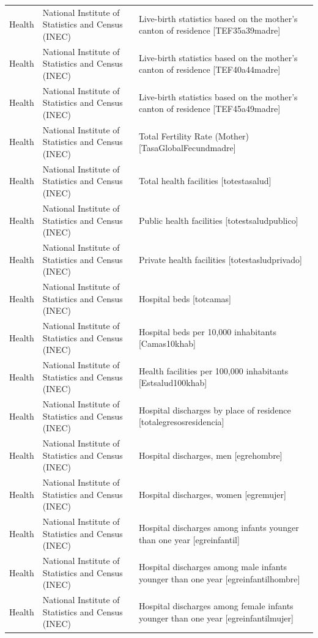 \begin{landscape}
\begin{longtable}[t]{>{\raggedright\arraybackslash}p{3.4cm}>{\raggedright\arraybackslash}p{5.6cm}>{\raggedright\arraybackslash}p{12.4cm}}
Health & National Institute of Statistics and Census (INEC) & Live-birth statistics based on the mother's canton of residence [TEF35a39madre]\\
Health & National Institute of Statistics and Census (INEC) & Live-birth statistics based on the mother's canton of residence [TEF40a44madre]\\
Health & National Institute of Statistics and Census (INEC) & Live-birth statistics based on the mother's canton of residence [TEF45a49madre]\\
Health & National Institute of Statistics and Census (INEC) & Total Fertility Rate (Mother) [TasaGlobalFecundmadre]\\
Health & National Institute of Statistics and Census (INEC) & Total health facilities [totestasalud]\\
Health & National Institute of Statistics and Census (INEC) & Public health facilities [totestsaludpublico]\\
Health & National Institute of Statistics and Census (INEC) & Private health facilities [totestasludprivado]\\
Health & National Institute of Statistics and Census (INEC) & Hospital beds [totcamas]\\
Health & National Institute of Statistics and Census (INEC) & Hospital beds per 10,000 inhabitants [Camas10khab]\\
Health & National Institute of Statistics and Census (INEC) & Health facilities per 100,000 inhabitants [Estsalud100khab]\\
Health & National Institute of Statistics and Census (INEC) & Hospital discharges by place of residence [totalegresosresidencia]\\
Health & National Institute of Statistics and Census (INEC) & Hospital discharges, men [egrehombre]\\
Health & National Institute of Statistics and Census (INEC) & Hospital discharges, women [egremujer]\\
Health & National Institute of Statistics and Census (INEC) & Hospital discharges among infants younger than one year [egreinfantil]\\
Health & National Institute of Statistics and Census (INEC) & Hospital discharges among male infants younger than one year [egreinfantilhombre]\\
Health & National Institute of Statistics and Census (INEC) & Hospital discharges among female infants younger than one year [egreinfantilmujer]\\

\end{longtable}
\end{landscape}
